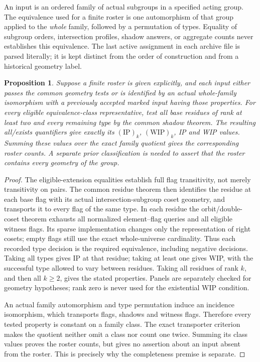 \documentclass[11pt,a4paper]{article}
\newtheorem{proposition}{Proposition}
\begin{document}
An input is an ordered family of actual subgroups in a specified acting
group. The equivalence used for a finite roster is one automorphism of
that group applied to the \emph{whole} family, followed by a permutation
of types. Equality of subgroup orders, intersection profiles, shadow
answers, or aggregate counts never establishes this equivalence.
The last active assignment in each archive file is parsed literally;
it is kept distinct from the order of construction and from a historical
geometry label.

\begin{proposition}\label{application-method}
Suppose a finite roster is given explicitly, and each input either passes
the common geometry tests or is identified by an actual whole-family
isomorphism with a previously accepted marked input having those
properties. For every eligible equivalence-class representative, test
all base residues of rank at least two and every remaining type by the
common shadow theorem. The resulting all/exists quantifiers give exactly
its $(\mathrm{IP})_k$, $(\mathrm{WIP})_k$, IP and WIP values. Summing
these values over the exact family quotient gives the corresponding
roster counts. A separate prior classification is needed to assert
that the roster contains every geometry of the group.
\end{proposition}
\begin{proof}
The eligible-extension equalities establish full flag transitivity, not
merely transitivity on pairs. The common residue theorem then identifies
the residue at each base flag with its actual intersection-subgroup
coset geometry, and transports it to every flag of the same type. In
each residue the orbit/double-coset theorem exhausts all normalized
element--flag queries and all eligible witness flags. Its sparse
implementation changes only the representation of right cosets; empty
flags still use the exact whole-universe cardinality. Thus each recorded
type decision is the required equivalence, including negative decisions.
Taking all types gives IP at that residue; taking at least one gives
WIP, with the successful type allowed to vary between residues.
Taking all residues of rank $k$, and then all $k\geq2$, gives the stated
properties. Panels are separately checked for geometry hypotheses;
rank zero is never used for the existential WIP condition.

An actual family automorphism and type permutation induce an incidence
isomorphism, which transports flags, shadows and witness flags. Therefore
every tested property is constant on a family class. The exact
transporter criterion makes the quotient neither omit a class nor count
one twice. Summing its class values proves the roster counts, but gives
no assertion about an input absent from the roster. This is precisely
why the completeness premise is separate.
\end{proof}
\end{document}

